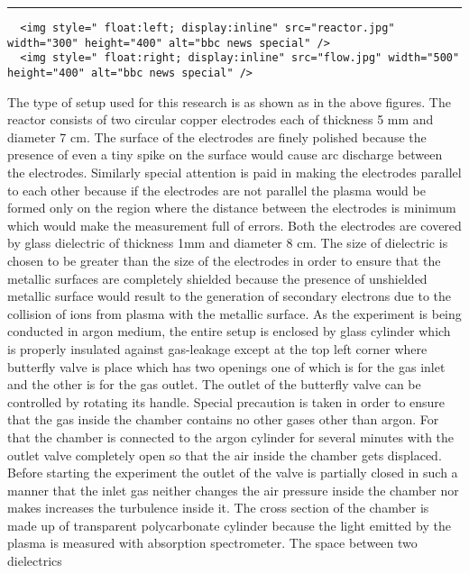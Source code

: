 \documentclass[11pt]{article}
\begin{document}
\begin{center}\rule{0.5\linewidth}{\linethickness}\end{center}

\begin{verbatim}
  <img style=" float:left; display:inline" src="reactor.jpg" width="300" height="400" alt="bbc news special" />
  <img style=" float:right; display:inline" src="flow.jpg" width="500" height="400" alt="bbc news special" />
\end{verbatim}

The type of setup used for this research is as shown as in the above
figures. The reactor consists of two circular copper electrodes each of
thickness 5 mm and diameter 7 cm. The surface of the electrodes are
finely polished because the presence of even a tiny spike on the surface
would cause arc discharge between the electrodes. Similarly special
attention is paid in making the electrodes parallel to each other
because if the electrodes are not parallel the plasma would be formed
only on the region where the distance between the electrodes is minimum
which would make the measurement full of errors. Both the electrodes are
covered by glass dielectric of thickness 1mm and diameter 8 cm. The size
of dielectric is chosen to be greater than the size of the electrodes in
order to ensure that the metallic surfaces are completely shielded
because the presence of unshielded metallic surface would result to the
generation of secondary electrons due to the collision of ions from
plasma with the metallic surface. As the experiment is being conducted
in argon medium, the entire setup is enclosed by glass cylinder which is
properly insulated against gas-leakage except at the top left corner
where butterfly valve is place which has two openings one of which is
for the gas inlet and the other is for the gas outlet. The outlet of the
butterfly valve can be controlled by rotating its handle. Special
precaution is taken in order to ensure that the gas inside the chamber
contains no other gases other than argon. For that the chamber is
connected to the argon cylinder for several minutes with the outlet
valve completely open so that the air inside the chamber gets displaced.
Before starting the experiment the outlet of the valve is partially
closed in such a manner that the inlet gas neither changes the air
pressure inside the chamber nor makes increases the turbulence inside
it. The cross section of the chamber is made up of transparent
polycarbonate cylinder because the light emitted by the plasma is
measured with absorption spectrometer. The space between two dielectrics
\end{document}
